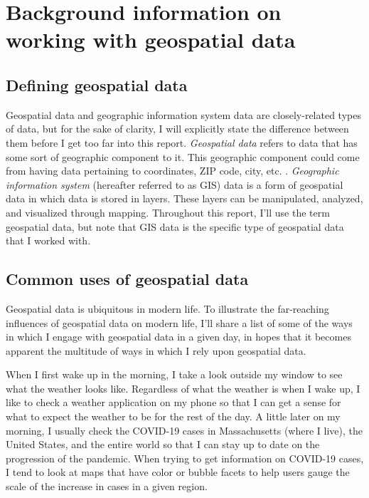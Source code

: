 \documentclass[12pt]{article}
\begin{document}
\newpage

\hypertarget{background-information-on-working-with-geospatial-data}{%
\section{Background information on working with geospatial
data}\label{background-information-on-working-with-geospatial-data}}

\hypertarget{defining-geospatial-data}{%
\subsection{Defining geospatial data}\label{defining-geospatial-data}}

Geospatial data and geographic information system data are
closely-related types of data, but for the sake of clarity, I will
explicitly state the difference between them before I get too far into
this report. \emph{Geospatial data} refers to data that has some sort of
geographic component to it. This geographic component could come from
having data pertaining to coordinates, ZIP code, city, etc.
\citep{dempseyWhatDifferenceGIS2014a}. \emph{Geographic information
system} (hereafter referred to as GIS) data is a form of geospatial data
in which data is stored in layers. These layers can be manipulated,
analyzed, and visualized through mapping. Throughout this report, I'll
use the term geospatial data, but note that GIS data is the specific
type of geospatial data that I worked with.

\hypertarget{common-uses-of-geospatial-data}{%
\subsection{Common uses of geospatial
data}\label{common-uses-of-geospatial-data}}

Geospatial data is ubiquitous in modern life. To illustrate the
far-reaching influences of geospatial data on modern life, I'll share a
list of some of the ways in which I engage with geospatial data in a
given day, in hopes that it becomes apparent the multitude of ways in
which I rely upon geospatial data.

When I first wake up in the morning, I take a look outside my window to
see what the weather looks like. Regardless of what the weather is when
I wake up, I like to check a weather application on my phone so that I
can get a sense for what to expect the weather to be for the rest of the
day. A little later on my morning, I usually check the COVID-19 cases in
Massachusetts (where I live), the United States, and the entire world so
that I can stay up to date on the progression of the pandemic. When
trying to get information on COVID-19 cases, I tend to look at maps that
have color or bubble facets to help users gauge the scale of the
increase in cases in a given region.
\end{document}
